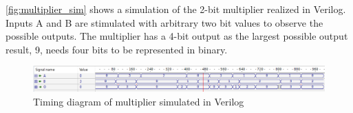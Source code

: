 \autoref{fig:multiplier_sim} shows a simulation of the 2-bit multiplier realized in Verilog. Inputs A and B are stimulated with arbitrary two bit values to observe the possible outputs. The multiplier has a 4-bit output as the largest possible output result, 9, needs four bits to be represented in binary.

\begin{figure}[H]
    \centering
    \includegraphics[width=\textwidth]{Figures/Test of multiplier.png}
    \caption{Timing diagram of multiplier simulated in Verilog}
    \label{fig:multiplier_sim}
\end{figure}




